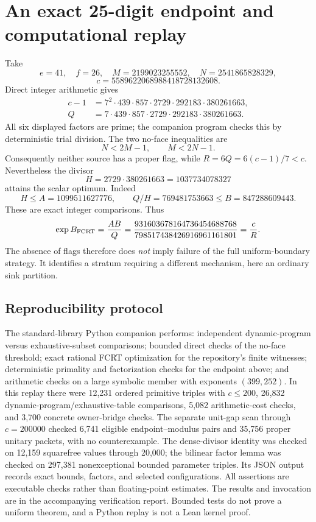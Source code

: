 \section{An exact 25-digit endpoint and computational replay}
Take
\[
 e=41,\quad f=26,\quad
 M=2199023255552,\quad N=2541865828329,
\]
\[
 c=5589622068988418728132608.
\]
Direct integer arithmetic gives
\begin{align*}
 c-1&=7^2\cdot439\cdot857\cdot2729\cdot292183\cdot380261663,\\
 Q&=7\cdot439\cdot857\cdot2729\cdot292183\cdot380261663.
\end{align*}
All six displayed factors are prime; the companion program checks this by
deterministic trial division. The two no-face inequalities are
\[
 N<2M-1,\qquad M<2N-1.
\]
Consequently neither source has a proper flag, while \(R=6Q=6(c-1)/7<c\).
Nevertheless the divisor
\[
 H=2729\cdot380261663=1037734078327
\]
attains the scalar optimum. Indeed
\[
 H\le A=1099511627776,\qquad
 Q/H=769481753663\le B=847288609443.
\]
These are exact integer comparisons. Thus
\[
 \exp B_{\mathrm{FCRT}}=\frac{AB}{Q}
  =\frac{931603678164736454688768}{798517438426916961161801}
  =\frac{c}{R}.
\]
The absence of flags therefore does \emph{not} imply failure of the full
uniform-boundary strategy. It identifies a stratum requiring a different
mechanism, here an ordinary sink partition.

\subsection{Reproducibility protocol}
The standard-library Python companion performs: independent dynamic-program
versus exhaustive-subset comparisons; bounded direct checks of the no-face
threshold; exact rational FCRT optimization for the repository's finite
witnesses; deterministic primality and factorization checks for the endpoint
above; and arithmetic checks on a large symbolic member with exponents
\((399,252)\). In this replay there were 12,231 ordered primitive triples with \(c\le200\),
26,832 dynamic-program/exhaustive-table comparisons, 5,082 arithmetic-cost
checks, and 3,700 concrete owner-bridge checks. The separate unit-gap scan
through \(c=200000\) checked 6,741 eligible endpoint--modulus pairs and
35,756 proper unitary packets, with no counterexample. The dense-divisor
identity was checked on 12,159 squarefree values through 20,000; the bilinear
factor lemma was checked on 297,381 nonexceptional bounded parameter triples.
Its JSON output records exact bounds, factors, and selected configurations. All assertions are executable checks rather than
floating-point estimates. The results and invocation are in the accompanying
verification report. Bounded tests do not prove a uniform theorem, and a
Python replay is not a Lean kernel proof.

